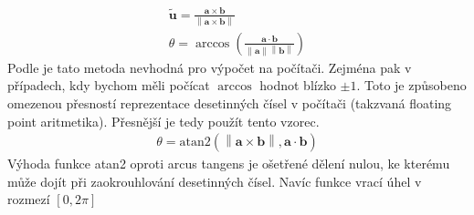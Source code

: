 \documentclass[twoside]{ctuthesis}
\newcommand{\norm}[1]{\left\lVert#1\right\rVert}
\begin{document}
\begin{align}
    \tilde{\mathbf{u}} = \frac{\mathbf{a} \times \mathbf{b}}{\norm{\mathbf{a}\times \mathbf{b}}} \label{eq:vector_rogrig}\\
    \theta = \arccos \left( \frac{\mathbf{a} \cdot \mathbf{b}}{\norm{\mathbf{a}}\norm{\mathbf{b}}} \right) \label{eq:angle_rogrig}
\end{align}
Podle \cite{james_w_angle_2014} je tato metoda nevhodná pro výpočet na počítači. Zejména pak v případech, kdy bychom měli počícat $\arccos$ hodnot blízko $\pm 1$. Toto je způsobeno omezenou přesností reprezentace desetinných čísel v počítači (takzvaná floating point aritmetika). Přesnější je tedy použít tento vzorec.
\begin{align}
    \theta = \text{atan2}\left( \norm{\mathbf{a} \times \mathbf{b}}, \mathbf{a}\cdot \mathbf{b} \right) 
\end{align}
Výhoda funkce atan2 oproti arcus tangens je ošetřené dělení nulou, ke kterému může dojít při zaokrouhlování desetinných čísel. Navíc funkce vrací úhel v rozmezí $\left[ 0, 2\pi \right]$
\end{document}
